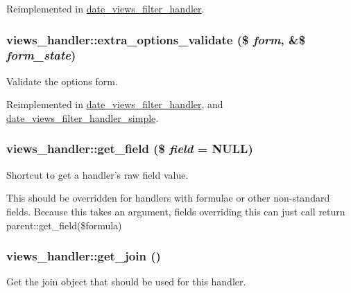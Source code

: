 Reimplemented in \hyperlink{classdate__views__filter__handler_af1326072f8c40f95d86d680d52bba8b4}{date\_\-views\_\-filter\_\-handler}.\hypertarget{classviews__handler_a8a2c2fb295ec8024fc9e33361a92e8ac}{
\subsubsection[{extra\_\-options\_\-validate}]{\setlength{\rightskip}{0pt plus 5cm}views\_\-handler::extra\_\-options\_\-validate (\$ {\em form}, \/  \&\$ {\em form\_\-state})}}
\label{classviews__handler_a8a2c2fb295ec8024fc9e33361a92e8ac}
Validate the options form. 

Reimplemented in \hyperlink{classdate__views__filter__handler_af9d27a5bd6a2c0fe3c81327daf5ef45e}{date\_\-views\_\-filter\_\-handler}, and \hyperlink{classdate__views__filter__handler__simple_a3b294398f9130f76fbf3144bf2120a63}{date\_\-views\_\-filter\_\-handler\_\-simple}.\hypertarget{classviews__handler_ab21c92ac39f9eaf30b85bfe29833df2f}{
\subsubsection[{get\_\-field}]{\setlength{\rightskip}{0pt plus 5cm}views\_\-handler::get\_\-field (\$ {\em field} = {\ttfamily NULL})}}
\label{classviews__handler_ab21c92ac39f9eaf30b85bfe29833df2f}
Shortcut to get a handler's raw field value.

This should be overridden for handlers with formulae or other non-\/standard fields. Because this takes an argument, fields overriding this can just call return parent::get\_\-field(\$formula) \hypertarget{classviews__handler_ac05dca8ea852b137f7f288d090a49221}{
\subsubsection[{get\_\-join}]{\setlength{\rightskip}{0pt plus 5cm}views\_\-handler::get\_\-join ()}}
\label{classviews__handler_ac05dca8ea852b137f7f288d090a49221}
Get the join object that should be used for this handler.

